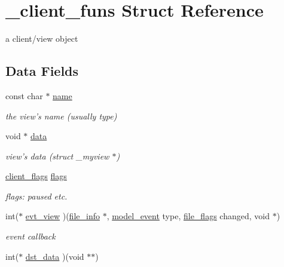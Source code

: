 \hypertarget{struct__client__funs}{
\section{\_\-client\_\-funs Struct Reference}
\label{struct__client__funs}
}
a client/view object  


\subsection*{Data Fields}
\begin{CompactItemize}
\item 
\hypertarget{struct__client__funs_o0}{
const char $\ast$ \hyperlink{struct__client__funs_o0}{name}}
\label{struct__client__funs_o0}

\begin{CompactList}\small\item\em the view's name (usually type) \item\end{CompactList}\item 
\hypertarget{struct__client__funs_o1}{
void $\ast$ \hyperlink{struct__client__funs_o1}{data}}
\label{struct__client__funs_o1}

\begin{CompactList}\small\item\em view's data (struct \_\-myview $\ast$) \item\end{CompactList}\item 
\hypertarget{struct__client__funs_o2}{
\hyperlink{model_8h_a153}{client\_\-flags} \hyperlink{struct__client__funs_o2}{flags}}
\label{struct__client__funs_o2}

\begin{CompactList}\small\item\em flags: paused etc. \item\end{CompactList}\item 
\hypertarget{struct__client__funs_o3}{
int($\ast$ \hyperlink{struct__client__funs_o3}{evt\_\-view} )(\hyperlink{struct__file__info}{file\_\-info} $\ast$, \hyperlink{model_8h_a154}{model\_\-event} type, \hyperlink{model_8h_a151}{file\_\-flags} changed, void $\ast$)}
\label{struct__client__funs_o3}

\begin{CompactList}\small\item\em event callback \item\end{CompactList}\item 
\hypertarget{struct__client__funs_o4}{
int($\ast$ \hyperlink{struct__client__funs_o4}{dst\_\-data} )(void $\ast$$\ast$)}
\label{struct__client__funs_o4}


\end{CompactItemize}
